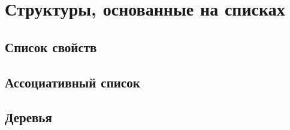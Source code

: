 \section{Структуры, основанные на списках}\label{common-lisp:baseconstructions:structures}
\subsection{Список свойств}\label{common-lisp:baseconstructions:structures:proplist}
\subsection{Ассоциативный список}\label{common-lisp:baseconstructions:structures:map}
\subsection{Деревья}\label{common-lisp:baseconstructions:structures:trees}
